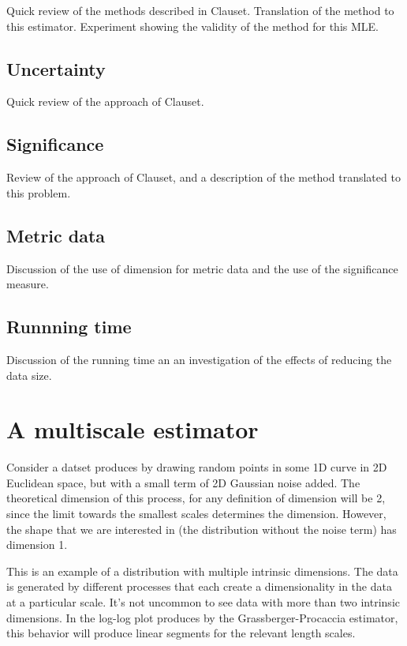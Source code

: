 \documentclass{article}
\begin{document}
Quick review of the methods described in Clauset. Translation of the method to this estimator. Experiment showing the validity of the method for this MLE.

\subsection{Uncertainty}

Quick review of the approach of Clauset.

\subsection{Significance}

Review of the approach of Clauset, and a description of the method translated to this problem.

\subsection{Metric data}

Discussion of the use of dimension for metric data and the use of the significance measure.

\subsection{Runnning time}

Discussion of the running time an an investigation of the effects of reducing the data size.

\section{A multiscale estimator}

Consider a datset produces by drawing random points in some 1D curve in 2D Euclidean space, but with a small term of 2D Gaussian noise added. The theoretical dimension of this process, for any definition of dimension will be 2, since the limit towards the smallest scales determines the dimension. However, the shape that we are interested in (the distribution without the noise term) has dimension 1. 

This is an example of a distribution with multiple intrinsic dimensions. The data is generated by different processes that each create a dimensionality in the data at a particular scale. It's not uncommon to see data with more than two intrinsic dimensions. In the log-log plot produces by the Grassberger-Procaccia estimator, this behavior will produce linear segments for the relevant length scales.
\end{document}
